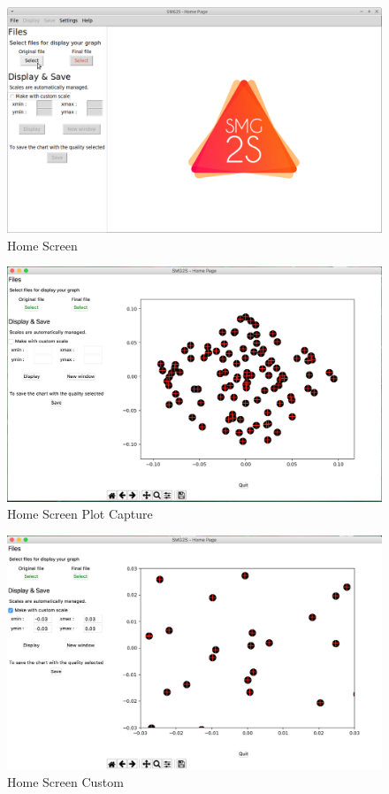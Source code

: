 \begin{figure}[htbp]
	\label{fig:Home}
	\caption{Home Screen}
	\centering
	\includegraphics[width=6.2in]{fig/home.png}
\end{figure}

\begin{figure}[htbp]
	\label{fig:Home Screen Plot Capture}
	\caption{Home Screen Plot Capture}
	\centering
	\includegraphics[width=6.2in]{fig/home_screen.png}
\end{figure}

\begin{figure}[htbp]
	\label{fig:Home Screen custom}
	\caption{Home Screen Custom}
	\centering
	\includegraphics[width=6.2in]{fig/home_screen_custom.png}
\end{figure}


